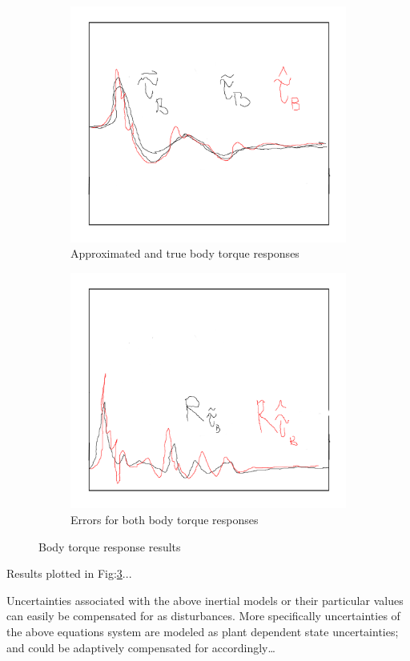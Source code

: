 \begin{figure}[hbtp]
\vspace{-6pt}
\centering
\begin{subfigure}{0.49\textwidth}
\includegraphics[width=\textwidth]{graphs/tau-body}
\caption{Approximated and true body torque responses}
\label{fig:tau-body}
\end{subfigure}
\begin{subfigure}{0.49\textwidth}
\centering
\includegraphics[width=\textwidth]{graphs/tau-body-r}
\caption{Errors for both body torque responses}
\label{fig:tau-body-r}
\end{subfigure}
\caption{Body torque response results}
\label{fig:body-torque-tau-b}
\end{figure}
\par
Results plotted in Fig:\ref{fig:body-torque-tau-b}...
\par
Uncertainties associated with the above inertial models or their particular values can easily be compensated for as disturbances. More specifically uncertainties of the above equations system are modeled as plant dependent state uncertainties; and could be adaptively compensated for accordingly\ldots
\newpage
